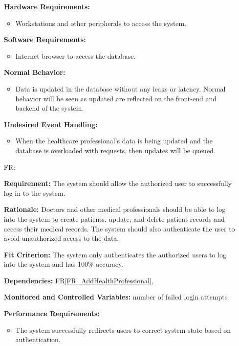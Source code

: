 \documentclass[12pt]{article}
\newcounter{reqnum} %
\begin{document}
\begin{itemize}
\textbf{Hardware Requirements:}
\begin{itemize}
  \item Workstations and other peripherals to access the system.
\end{itemize} 

\textbf{Software Requirements:}
\begin{itemize}
  \item Internet browser to access the database.
\end{itemize} 

\textbf{Normal Behavior:}
\begin{itemize}
  \item Data is updated in the database without any leaks or latency. Normal behavior will be seen as updated are reflected on the front-end and backend of the system.
\end{itemize} 

\textbf{Undesired Event Handling:}
\begin{itemize}
  \item When the healthcare professional’s data is being updated and the database is overloaded with requests, then updates will be queued.
\end{itemize} 

\item[FR\refstepcounter{reqnum}\thereqnum \label{FR_login}:]

\textbf{Requirement:} The system should allow the authorized user to successfully log in to the system.

\textbf{Rationale:} Doctors and other medical professionals should be able to log into the system to create patients, update, and delete patient records and access their medical records. The system should also authenticate the user to avoid unauthorized access to the data.

\textbf{Fit Criterion:} The system only authenticates the authorized users to log into the system and has 100\% accuracy. 

\textbf{Dependencies:} FR\ref{FR_AddHealthProfessional}, \label{NFR_Security}

\textbf{Monitored and Controlled Variables:} number of failed login attempts

\textbf{Performance Requirements:} 
\begin{itemize}
  \item The system successfully redirects users to correct system state based on authentication.
\end{itemize}


\end{itemize}
\end{document}
